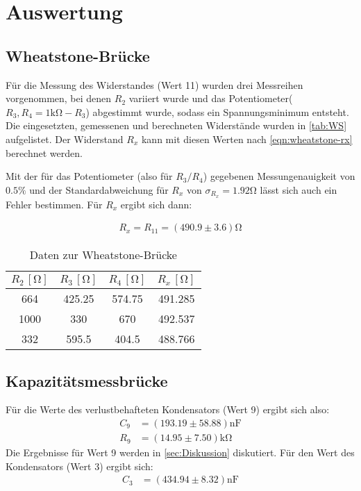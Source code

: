 \section{Auswertung}
\label{sec:Auswertung}

\subsection{Wheatstone-Brücke}
Für die Messung des Widerstandes (Wert 11) wurden drei Messreihen vorgenommen, bei denen $R_2$ variiert wurde und das Potentiometer($R_3, R_4=1\si{\kilo}\si{\ohm}-R_3$) abgestimmt wurde, sodass ein Spannungsminimum entsteht. Die eingesetzten, gemessenen und berechneten  Widerstände wurden in \autoref{tab:WS} aufgelistet. Der Widerstand $R_x$ kann mit diesen Werten nach \autoref{eqn:wheatstone-rx} berechnet werden.

Mit der für das Potentiometer (also für $R_3/R_4$) gegebenen Messungenauigkeit von $0.5\%$ und der Standardabweichung für $R_x$ von $\sigma_{R_x}=1.92 \si{\ohm}$ lässt sich auch ein Fehler bestimmen. Für $R_x$ ergibt sich dann: 

\begin{align}
  R_x=R_{11}=(490.9 \pm 3.6)\si{\ohm}
\end{align}

\begin{table}
  \centering
  \caption{Daten zur Wheatstone-Brücke}
  \label{tab:WS}
  \begin{tabular}{c c c c}
  \toprule
  $R_2 \, [\si{\ohm}]$ &$R_3 \, [\si{\ohm}]$ &$R_4 \, [\si{\ohm}]$ & $R_x \, [\si{\ohm}]$\\
  \midrule
   664 & 425.25 & 574.75& 491.285\\
   1000 & 330 & 670 & 492.537 \\
   332 & 595.5 & 404.5 & 488.766 \\
  \bottomrule
  \end{tabular}
\end{table}
\subsection{Kapazitätsmessbrücke}
Für die Werte des verlustbehafteten Kondensators (Wert 9) ergibt sich also:
\begin{align}
  C_9&=(193.19 \pm 58.88)\si{\nano} \si{\farad}\\
  R_9&=(14.95 \pm 7.50)\si{\kilo} \si{\ohm}
\end{align}
Die Ergebnisse für Wert 9 werden in \autoref{sec:Diskussion} diskutiert. 
Für den Wert des Kondensators (Wert 3) ergibt sich:
\begin{align}
  C_3&=(434.94 \pm 8.32)\si{\nano} \si{\farad}
\end{align}

